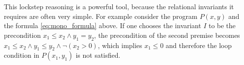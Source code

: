 

This lockstep reasoning is a powerful tool, because the relational invariants
it requires are often very simple. For example consider the program $P(x,y)$
and the formula \ref{eq:mono_formula} above. If one chooses the invariant $I$
to be the precondition $x_1 \leq x_2 \land y_1 = y_2$, the precondition of the
second premise becomes $x_1 \leq x_2 \land y_1 \leq y_2 \land \neg (x_2 > 0)$,
which implies $x_1 \leq 0$ and therefore the loop condition in $P(x_1, y_1)$ is not satisfied.



